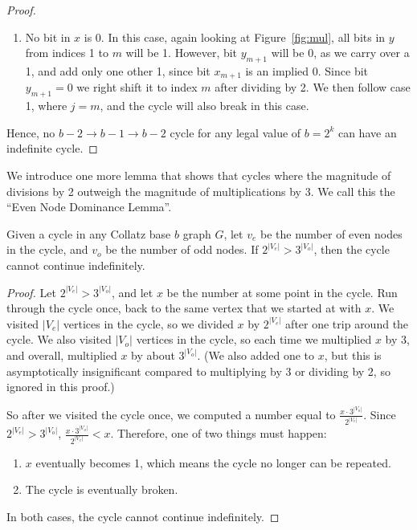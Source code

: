 \begin{proof}
\begin{enumerate}
    \item No bit in $x$ is 0. In this case, again looking at Figure~\ref{fig:mul}, all bits in $y$ from indices 1 to $m$ will be 1. However, bit $y_{m+1}$ will be 0, as we carry over a 1, and add only one other 1, since bit $x_{m+1}$ is an implied 0. Since bit $y_{m+1} = 0$ we right shift it to index $m$ after dividing by 2. We then follow case 1, where $j = m$, and the cycle will also break in this case.
 \end{enumerate}
 Hence, no $b-2 \rightarrow b-1 \rightarrow b-2$ cycle for any legal value of $b = 2^k$ can have an indefinite cycle. 
\end{proof}
We introduce one more lemma that shows that cycles where the magnitude of divisions by 2 outweigh the magnitude of multiplications by 3. We call this the ``Even Node Dominance Lemma''.
\begin{lemma}
\label{lem:EvenDom}
Given a cycle in any Collatz base $b$ graph $G$, let $v_{e}$ be the number of even nodes in the cycle, and $v_{o}$ be the number of odd nodes. If $2^{|V_e|} > 3^{|V_o|}$, then the cycle cannot continue indefinitely.
\end{lemma}
\begin{proof}
Let $2^{|V_e|} > 3^{|V_o|}$, and let $x$ be the number at some point in the cycle. Run through the cycle once, back to the same vertex that we started at with $x$. We visited $|V_e|$ vertices in the cycle, so we divided $x$ by $2^{|V_e|}$ after one trip around the cycle. We also visited $|V_o|$ vertices in the cycle, so each time we multiplied $x$ by 3, and overall, multiplied $x$ by about $3^{|V_o|}$. (We also added one to $x$, but this is asymptotically insignificant compared to multiplying by 3 or dividing by 2, so ignored in this proof.)\par
So after we visited the cycle once, we computed a number equal to $\frac{x\cdot 3^{|V_o|}}{2^{|V_e|}}$. Since $2^{|V_e|} > 3^{|V_o|}$, $\frac{x\cdot 3^{|V_o|}}{2^{|V_e|}} < x$. Therefore, one of two things must happen:
\begin{enumerate}
\item $x$ eventually becomes 1, which means the cycle no longer can be repeated.
\item The cycle is eventually broken.
\end{enumerate}
In both cases, the cycle cannot continue indefinitely.
\end{proof}
